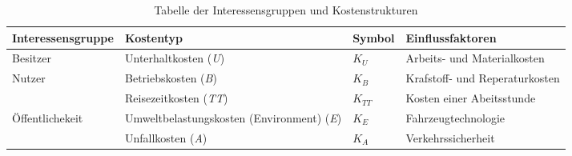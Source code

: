 %
%
%
%

\begin{table}[h!]
\flushleft
\renewcommand{\arraystretch}{1.4}

%
%
\begin{tabular}{@{}p{3.3cm} p{4cm} p{1cm} l @{}} \\   
\toprule
\textbf{Interessensgruppe} & \textbf{Kostentyp} & \textbf{Symbol} & \textbf{Einflussfaktoren} 			\\
\midrule
Besitzer                   & Unterhaltkosten (\textit{U})                    		& $K_{U}$    & Arbeits- und Materialkosten              \\
Nutzer		               & Betriebskosten (\textit{B})                     		& $K_{B}$    & Krafstoff- und Reperaturkosten                     \\
                           & Reisezeitkosten (\textit{TT})            		 		& $K_{TT}$   & Kosten einer Abeitsstunde   \\
Öffentlichekeit           & Umweltbelastungskosten \newline (Environment) (\textit{E}) & $K_{E}$  &  Fahrzeugtechnologie      \\
                           & Unfallkosten (\textit{A})                       		& $K_{A}$    & Verkehrssicherheit    \\
\bottomrule

\end{tabular}
\caption{Tabelle der Interessensgruppen und Kostenstrukturen}
\label{tab:t-04-01-Interessensgruppen}
\end{table}


%


